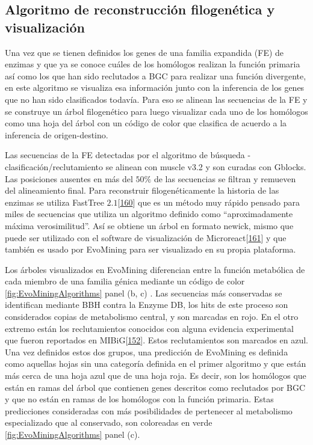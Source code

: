 \documentclass[12pt,twoside]{reedthesis}
\begin{document}
  \subsection{Algoritmo de reconstrucción filogenética y
  visualización}\label{algoritmo-de-reconstruccion-filogenetica-y-visualizacion-1}
  
  Una vez que se tienen definidos los genes de una familia expandida (FE)
  de enzimas y que ya se conoce cuáles de los homólogos realizan la
  función primaria así como los que han sido reclutados a BGC para
  realizar una función divergente, en este algoritmo se visualiza esa
  información junto con la inferencia de los genes que no han sido
  clasificados todavía. Para eso se alinean las secuencias de la FE y se
  construye un árbol filogenético para luego visualizar cada uno de los
  homólogos como una hoja del árbol con un código de color que clasifica
  de acuerdo a la inferencia de origen-destino.
  
  Las secuencias de la FE detectadas por el algoritmo de búsqueda -
  clasificación/reclutamiento se alinean con muscle v3.2 y son curadas con
  Gblocks. Las posiciones ausentes en más del \(50\%\) de las secuencias
  se filtran y remueven del alineamiento final. Para reconstruir
  filogenéticamente la historia de las enzimas se utiliza FastTree
  \(2.1\){[}\protect\hyperlink{ref-price_fasttree_2010}{160}{]} que es un
  método muy rápido pensado para miles de secuencias que utiliza un
  algoritmo definido como ``aproximadamente máxima verosimilitud''. Así se
  obtiene un árbol en formato newick, mismo que puede ser utilizado con el
  software de visualización de
  Microreact{[}\protect\hyperlink{ref-argimon_microreact_2016}{161}{]} y
  que también es usado por EvoMining para ser visualizado en su propia
  plataforma.
  
  Los árboles visualizados en EvoMining diferencian entre la función
  metabólica de cada miembro de una familia génica mediante un código de
  color \autoref{fig:EvoMiningAlgorithms} panel (b, c) . Las secuencias
  más conservadas se identifican mediante BBH contra la Enzyme DB, los
  hits de este proceso son considerados copias de metabolismo central, y
  son marcadas en rojo. En el otro extremo están los reclutamientos
  conocidos con alguna evidencia experimental que fueron reportados en
  MIBiG{[}\protect\hyperlink{ref-medema_minimum_2015}{152}{]}. Estos
  reclutamientos son marcados en azul. Una vez definidos estos dos grupos,
  una predicción de EvoMining es definida como aquellas hojas sin una
  categoría definida en el primer algoritmo y que están más cerca de una
  hoja azul que de una hoja roja. Es decir, son los homólogos que están en
  ramas del árbol que contienen genes descritos como reclutados por BGC y
  que no están en ramas de los homólogos con la función primaria. Estas
  predicciones consideradas con más posibilidades de pertenecer al
  metabolismo especializado que al conservado, son coloreadas en verde
  \autoref{fig:EvoMiningAlgorithms} panel (c).
  
\end{document}
